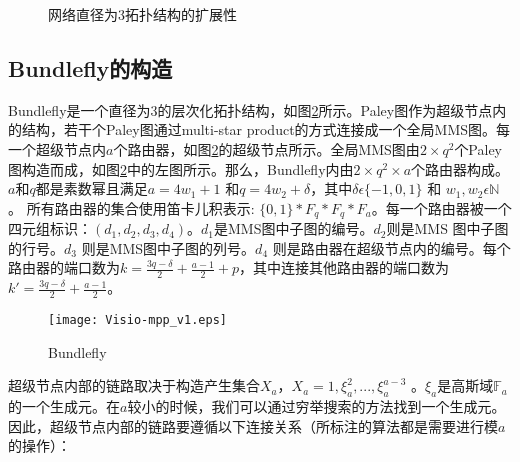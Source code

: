 \begin{figure}[t]
\setlength{\belowcaptionskip}{-.3cm}%
  \centering
   \begin{minipage}[t]{\textwidth}
   \centering
  \vspace{-.3cm}
  \caption{网络直径为3拓扑结构的扩展性}
  \label{constructdfv89}
  \end{minipage}
\end{figure}

 \subsection{Bundlefly的构造}

 Bundlefly是一个直径为3的层次化拓扑结构，如图\ref{mppv0}所示。Paley图作为超级节点内的结构，若干个Paley图通过multi-star product的方式连接成一个全局MMS图。每一个超级节点内$a$个路由器，如图\ref{mppv0}的超级节点所示。全局MMS图由$2\times q^2$个Paley 图构造而成，如图\ref{mppv0}中的左图所示。那么，Bundlefly内由$2\times q^2\times a$个路由器构成。$a$和$q$都是素数幂且满足$a=4w_{1}+1$ 和$q=4w_{2}+\delta$，其中$\delta\epsilon\{-1,0,1\}$ 和 $w_{1}, w_{2}\epsilon\mathds{N}$。 所有路由器的集合使用笛卡儿积表示: $\{0,1\}*F_{q}*F_{q}*F_{a}$。每一个路由器被一个四元组标识：$(d_{1},d_{2},d_{3},d_{4})$。$d_{1}$是MMS图中子图的编号。$d_{2}$则是MMS 图中子图的行号。$d_{3}$ 则是MMS图中子图的列号。$d_{4}$ 则是路由器在超级节点内的编号。每个路由器的端口数为$k=\frac{3q-\delta}{2}+\frac{a-1}{2}+p$，其中连接其他路由器的端口数为$k'=\frac{3q-\delta}{2}+\frac{a-1}{2}$。

 \begin{figure}[t]
\setlength{\belowcaptionskip}{-.5cm}
  \centering
    \texttt{[image: Visio-mpp\_v1.eps]}
  \vspace{-.3cm}
  \caption{Bundlefly}
  \label{mppv0}
\end{figure}

超级节点内部的链路取决于构造产生集合$X_{a}$，$X_{a}={1,\xi_{a}^{2},...,\xi_{a}^{a-3}}$ 。$\xi_{a}$是高斯域$\mathds{F}_{a}$的一个生成元。在$a$较小的时候，我们可以通过穷举搜索的方法找到一个生成元。 因此，超级节点内部的链路要遵循以下连接关系（所标注的算法都是需要进行模$a$的操作）：

